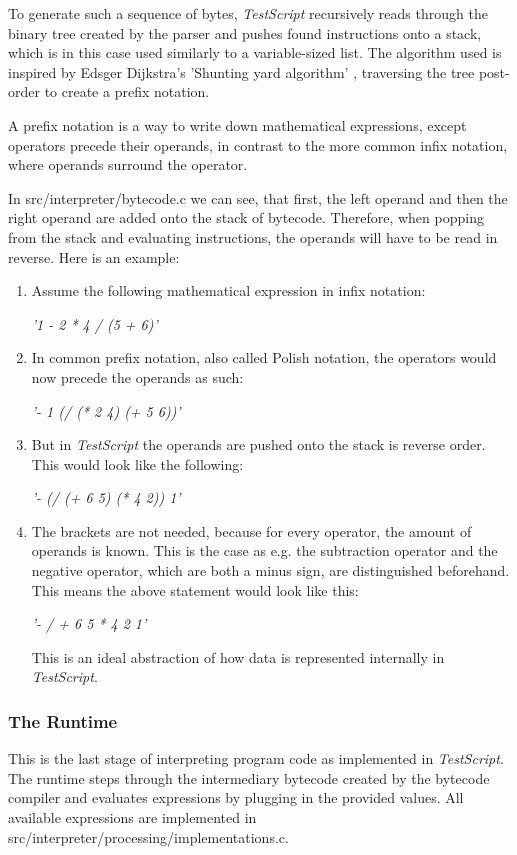 \documentclass[12pt,a4paper]{article}
\newcommand{\cte}[1] {
    \cite{#1}
}
\newcommand{\expr}[1] {
    \begin{center}
        #1
    \end{center}
}
\newcommand{\name}{\emph{TestScript}}
\begin{document}
To generate such a sequence of bytes, \name{} recursively reads through the
binary tree created by the parser and pushes found instructions onto a stack,
which is in this case used similarly to a variable-sized list.
The algorithm used is inspired by Edsger Dijkstra's 'Shunting yard 
algorithm'\cte{shunting_yard}, traversing the tree post-order to create
a prefix notation. 

A prefix notation is a way to write down mathematical expressions, except
operators precede their operands, in contrast to the more common infix notation,
where operands surround the operator.

In src/interpreter/bytecode.c we can see, that first, the left operand and then
the right operand are added onto the stack of bytecode. Therefore, when
popping from the stack and evaluating instructions, the operands will have to
be read in reverse.
Here is an example:
\begin{enumerate}
    \item Assume the following mathematical expression in infix notation:
        \expr{\emph{'1 - 2 * 4 / (5 + 6)'}}
    \item In common prefix notation, also called Polish notation, the
        operators would now precede the operands as such:
        \expr{\emph{'- 1 (/ (* 2 4) (+ 5 6))'}}
    \item But in \name{} the operands are pushed onto the stack is reverse order.
        This would look like the following:
        \expr{\emph{'- (/ (+ 6 5) (* 4 2)) 1'}}
    \item The brackets are not needed, because for every operator, the amount
        of operands is known. This is the case as e.g. the subtraction operator
        and the negative operator, which are both a minus sign, are distinguished
        beforehand. This means the above statement would look like this:
        \expr{\emph{'- / + 6 5 * 4 2 1'}}
        This is an ideal abstraction of how data 
        is represented internally in \name{}.
\end{enumerate}

\subsubsection{The Runtime}
This is the last stage of interpreting program code as implemented in \name{}.
The runtime steps through the intermediary bytecode created by the bytecode
compiler and evaluates expressions by plugging in the provided values.
All available expressions are implemented in 
src/interpreter/processing/implementations.c.
\end{document}

